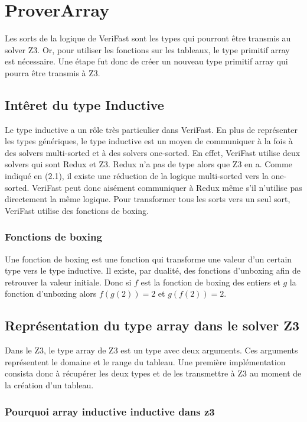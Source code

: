 \documentclass[9pt,openany]{book}
\newcommand{\verifast}{VeriFast}
\begin{document}
	\section{ProverArray}
		
		Les sorts de la logique de \verifast{} sont les types qui pourront \^etre transmis au solver Z3. Or, pour utiliser les fonctions sur les tableaux, le type primitif array est n\'ecessaire. Une \'etape fut donc de cr\'eer un nouveau type primitif array qui pourra \^etre transmis \`a Z3.\par
		\subsection{Int\^eret du type Inductive}
			Le type inductive a un r\^ole tr\`es particulier dans \verifast{}. En plus de repr\'esenter les types g\'en\'eriques, le type inductive est un moyen de communiquer \`a la fois \`a des solvers multi-sorted et \`a des solvers one-sorted. En effet, \verifast{} utilise deux solvers qui sont Redux et Z3. Redux n'a pas de type alors que Z3 en a. Comme indiqu\'e en (2.1), il existe une r\'eduction de la logique multi-sorted vers la one-sorted. \verifast{} peut donc ais\'ement communiquer \`a Redux m\^eme s'il n'utilise pas directement la m\^eme logique. Pour transformer tous les sorts vers un seul sort, \verifast{} utilise des fonctions de boxing.
			\subsubsection{Fonctions de boxing}
			Une fonction de boxing est une fonction qui transforme une valeur d'un certain type vers le type inductive. Il existe, par dualit\'e, des fonctions d'unboxing afin de retrouver la valeur initiale. Donc si $f$ est la fonction de boxing des entiers et $g$ la fonction d'unboxing alors $f(g(2)) = 2$ et $g(f(2)) = 2$.
		\subsection{Repr\'esentation du type array dans le solver Z3}
			Dans le Z3, le type array de Z3 est un type avec deux arguments. Ces arguments repr\'esentent le domaine et le range du tableau. Une premi\`ere impl\'ementation consista donc \`a r\'ecup\'erer les deux types et de les transmettre \`a Z3 au moment de la cr\'eation d'un tableau.
			\subsubsection{Pourquoi array inductive inductive dans z3}
\end{document}
